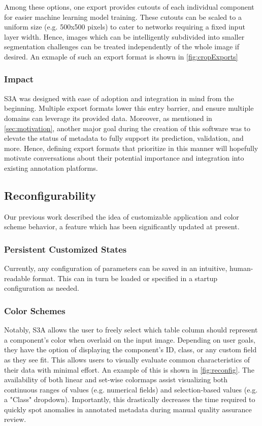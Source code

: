 Among these options, one export provides cutouts of each individual component for easier machine learning model training. These cutouts can be scaled to a uniform size (e.g. 500x500 pixels) to cater to networks requiring a fixed input layer width. Hence, images which can be intelligently subdivided into smaller segmentation challenges can be treated independently of the whole image if desired. An exmaple of such an export format is shown in \autoref{fig:cropExports}

\makeCropExportsFig

\subsubsection{Impact}
S3A was designed with ease of adoption and integration in mind from the beginning. Multiple export formats lower this entry barrier, and ensure multiple domains can leverage its provided data. Moreover, as mentioned in \autoref{sec:motivation}, another major goal during the creation of this software was to elevate the status of metadata to fully support its prediction, validation, and more. Hence, defining export formats that prioritize in this manner will hopefully motivate conversations about their potential importance and integration into existing annotation platforms.


\subsection{Reconfigurability}
Our previous work \cite{jessurunComponentDetectionEvaluation2020} described the idea of customizable application and color scheme behavior, a feature which has been significantly updated at present.

\subsubsection{Persistent Customized States}
Currently, any configuration of parameters can be saved in an intuitive, human-readable format. This can in turn be loaded or specified in a startup configuration as needed.

\subsubsection{Color Schemes}
Notably, S3A allows the user to freely select which table column should represent a component's color when overlaid on the input image. Depending on user goals, they have the option of displaying the component's ID, class, or any custom field as they see fit. This allows users to visually evaluate common characteristics of their data with minimal effort. An example of this is shown in \autoref{fig:reconfig}. The availability of both linear and set-wise colormaps assist visualizing both continuous ranges of values (e.g. numerical fields) and selection-based values (e.g. a "Class" dropdown). Importantly, this drastically decreases the time required to quickly spot anomalies in annotated metadata during manual quality assurance review.

